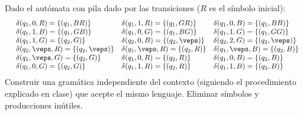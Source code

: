 \begin{ejercicio}\label{ej:1.5.19}
    Dado el autómata con pila dado por las transiciones ($R$ es el símbolo inicial):
    \begin{equation*}
        \begin{array}{llll}
            &\delta(q_1,0,R) = \{(q_1,BR)\} &\delta(q_1,1,R) = \{(q_1,GR)\} &\delta(q_1,0,B) = \{(q_1,BB)\} \\
            &\delta(q_1,1,B) = \{(q_1,GB)\} &\delta(q_1,0,G) = \{(q_1,BG)\} &\delta(q_1,1,G) = \{(q_1,GG)\} \\
            &\delta(q_1,1,G) = \{(q_2,G)\} &\delta(q_2,0,B) = \{(q_2,\veps)\} &\delta(q_2,2,G) = \{(q_2,\veps)\} \\
            &\delta(q_2,\veps,R) = \{(q_2,\veps)\} &\delta(q_1,\veps,R) = \{(q_2,R)\} &\delta(q_1,\veps,B) = \{(q_2,B)\} \\
            &\delta(q_1,\veps,G) = \{(q_2,G)\} &\delta(q_1,0,R) = \{(q_2,R)\} &\delta(q_1,0,B) = \{(q_2,B)\} \\
            &\delta(q_1,0,G) = \{(q_2,G)\} &\delta(q_1,1,R) = \{(q_2,R)\} &\delta(q_1,1,B) = \{(q_2,B)\} 
        \end{array}
    \end{equation*}
    Construir una gramática independiente del contexto (siguiendo el procedimiento explicado en clase) que acepte el mismo lenguaje. Eliminar símbolos y producciones inútiles.

\end{ejercicio}

